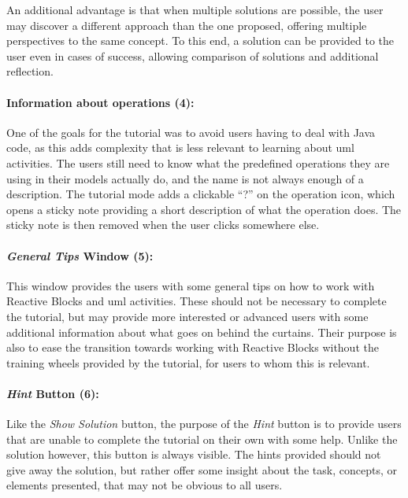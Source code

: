 \noindent
An additional advantage is that when multiple solutions are possible, the user may discover a different approach than the one proposed, offering multiple perspectives to the same concept. To this end, a solution can be provided to the user even in cases of success, allowing comparison of solutions and additional reflection.

\paragraph{Information about operations (4):} One of the goals for the tutorial was to avoid users having to deal with Java code, as this adds complexity that is less relevant to learning about \gls{uml} activities. The users still need to know what the predefined operations they are using in their models actually do, and the name is not always enough of a description. The tutorial mode adds a clickable ``?'' on the operation icon, which opens a sticky note providing a short description of what the operation does. The sticky note is then removed when the user clicks somewhere else.

\paragraph{\emph{General Tips} Window (5):} This window provides the users with some general tips on how to work with Reactive Blocks and \gls{uml} activities. These should not be necessary to complete the tutorial, but may provide more interested or advanced users with some additional information about what goes on behind the curtains. Their purpose is also to ease the transition towards working with Reactive Blocks without the training wheels provided by the tutorial, for users to whom this is relevant.

\paragraph{\emph{Hint} Button (6):} Like the \emph{Show Solution}
button, the purpose of the \emph{Hint} button is to provide users that are unable to complete the tutorial on their own with some help. Unlike the solution however, this button is always visible. The hints provided should not give away the solution, but rather offer some insight about the task, concepts, or elements presented, that may not be obvious to all users.

